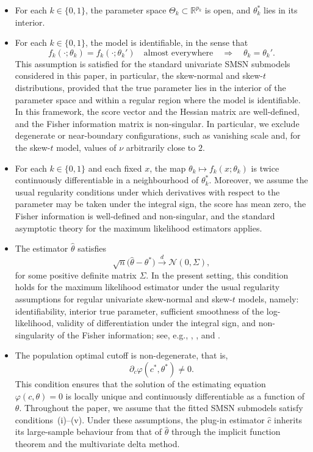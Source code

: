 \documentclass[11pt,a4paper]{article}
\theoremstyle{definition}
\theoremstyle{remark}
\newcommand{\1}{\mathbf{1}}
\begin{document}
\begin{itemize}
\item[(i)] For each $k\in\{0,1\}$, the parameter space
$\Theta_k\subset\mathbb R^{p_k}$ is open, and
$\theta_k^*$ lies in its interior.

\item[(ii)] For each $k\in\{0,1\}$, the model is identifiable, in the sense
that
\[
f_k(\cdot;\theta_k)=f_k(\cdot;\theta_k')
\quad\text{almost everywhere}
\quad\Longrightarrow\quad
\theta_k=\theta_k'.
\]
This assumption is satisfied for the standard univariate SMSN
submodels considered in this paper, in particular, the
skew-normal and skew-$t$ distributions, provided that the true parameter lies in the interior of the parameter space and within a regular region where the model is identifiable. In this framework, the score vector and the Hessian matrix are well-defined, and the Fisher information matrix is non-singular. In particular, we exclude degenerate or near-boundary configurations, such as vanishing scale and, for the skew-$t$ model, values of $\nu$ arbitrarily close to $2$.

\item[(iii)] For each $k\in\{0,1\}$ and each fixed $x$, the map $\theta_k\mapsto f_k(x;\theta_k)$ is twice continuously differentiable in a neighbourhood of $\theta_k^*$. Moreover, we assume the usual regularity conditions under which derivatives with respect to the parameter may be taken under the integral sign, the score has mean zero, the Fisher information is well-defined and non-singular, and the standard asymptotic theory for the maximum likelihood estimators applies.

\item[(iv)] The estimator $\hat\theta$ satisfies
\begin{equation}
\label{eq:theta-an}
\sqrt{n}\bigl(\hat\theta-\theta^*\bigr)
\stackrel{d}{\longrightarrow}
\mathcal N(0,\Sigma),
\end{equation}
for some positive definite matrix $\Sigma$.
In the present setting, this condition holds for the maximum likelihood estimator under the usual regularity assumptions for regular univariate skew-normal and skew-$t$ models, namely: identifiability, interior true parameter, sufficient smoothness of the log-likelihood, validity of differentiation under the integral sign, and non-singularity of the Fisher information; see, e.g., \citet{arevalillo2012maximum},
\citet{azzalini2014skew}, and \citet{van2000asymptotic}.

\item[(v)] The population optimal cutoff is non-degenerate, that is,
\[
\partial_c\varphi(c^*,\theta^*)\neq 0.
\]
This condition ensures that the solution of the estimating equation $\varphi(c,\theta)=0$ is locally unique and continuously differentiable as a function of $\theta$. Throughout the paper, we assume that the fitted SMSN submodels satisfy conditions~(i)--(v). Under these assumptions, the
plug-in estimator $\hat c$ inherits its large-sample behaviour from that of $\hat\theta$ through the implicit function theorem and the multivariate delta method.
\end{itemize}
\end{document}
